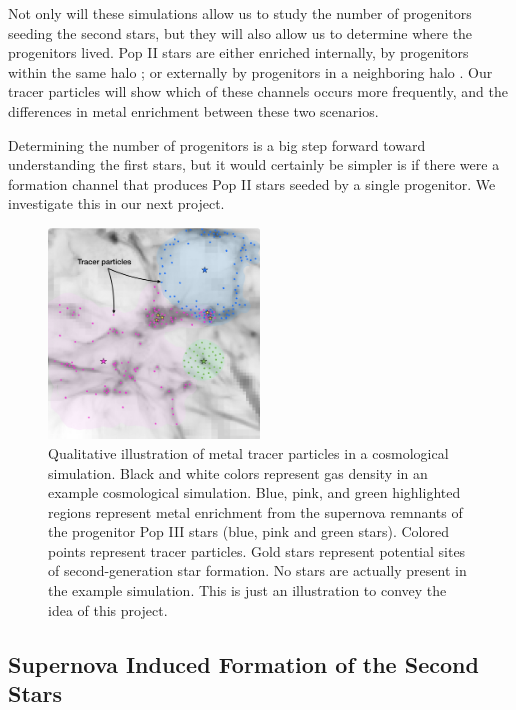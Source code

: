 \documentclass[a4paper, 12pt]{article}
\begin{document}
Not only will these simulations allow us to study the number of progenitors seeding the second stars, but they will also allow us to determine where the progenitors lived. Pop II stars are either enriched internally, by progenitors within the same halo \citep{Chiaki2019}; or externally by progenitors in a neighboring halo \citep{Smith2015}. Our tracer particles will show which of these channels occurs more frequently, and the differences in metal enrichment between these two scenarios. 

Determining the number of progenitors is a big step forward toward understanding the first stars, but it would certainly be simpler is if there were a formation channel that produces Pop II stars seeded by a single progenitor. We investigate this in our next project.

\begin{figure}
  \includegraphics[width=0.5\textwidth]{figures/tracer_final}
  \caption{Qualitative illustration of metal tracer particles in a cosmological simulation. Black and white colors represent gas density in an example cosmological simulation. Blue, pink, and green highlighted regions represent metal enrichment from the supernova remnants of the progenitor Pop III stars (blue, pink and green stars). Colored points represent tracer particles. Gold stars represent potential sites of second-generation star formation. No stars are actually present in the example simulation. This is just an illustration to convey the idea of this project.}
  \label{fig:tracer}    
\end{figure}


\subsection{Supernova Induced Formation of the Second Stars}
\end{document}
